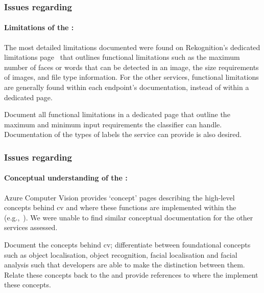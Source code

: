 \subsubsection[Dimension B Issues]{Issues regarding \dimb{}}

\paragraph{Limitations of the  :} The most detailed limitations documented were found on Rekognition's dedicated limitations page~ that outlines functional limitations such as the maximum number of faces or words that can be detected in an image, the size requirements of images, and file type information. For the other services, functional limitations are generally found within each endpoint's  documentation, instead of within a dedicated page.

\begin{leftbar}\SuggestedImprovement
Document all functional limitations in a dedicated page that outline the maximum and minimum input requirements the classifier can handle. Documentation of the types of labels the service can provide is also desired.  
\end{leftbar}


\subsubsection[Dimension C Issues]{Issues regarding \dimc{}}

\paragraph{Conceptual understanding of the  :} Azure Computer Vision provides `concept' pages describing the high-level concepts behind \gls{cv} and where these functions are implemented within the  (e.g.,~). We were unable to find similar conceptual documentation for the other services assessed.

\begin{leftbar}\SuggestedImprovement
Document the concepts behind \gls{cv}; differentiate between foundational concepts such as object localisation, object recognition, facial localisation and facial analysis such that developers are able to make the distinction between them. Relate these concepts back to the  and provide references to where the  implement these concepts.
\end{leftbar}

